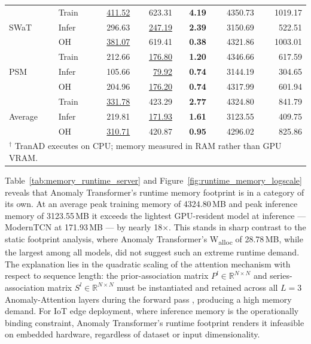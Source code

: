 \documentclass[twoside,11pt,openright]{report}
\begin{document}
\begin{table}[ht]
\begin{tabular}{ll rrrrr}
\midrule
\multirow{3}{*}{SWaT}
    & Train & \underline{411.52} & 623.31 &   \textbf{4.19} & 4350.73 & 1019.17 \\
    & Infer & 296.63 & \underline{247.19} &   \textbf{2.39} & 3150.69 &  522.51 \\
    & OH    & \underline{381.07} & 619.41 &   \textbf{0.38} & 4321.86 & 1003.01 \\
\midrule
\multirow{3}{*}{PSM}
    & Train & 212.66 & \underline{176.80} &   \textbf{1.20} & 4346.66 &  617.59 \\
    & Infer & 105.66 &  \underline{79.92} &   \textbf{0.74} & 3144.19 &  304.65 \\
    & OH    & 204.96 & \underline{176.20} &   \textbf{0.74} & 4317.99 &  601.94 \\
\midrule
\multirow{3}{*}{Average}
    & Train & \underline{331.78} & 423.29 &   \textbf{2.77} & 4324.80 &  841.79 \\
    & Infer & 219.81 & \underline{171.93} &   \textbf{1.61} & 3123.55 &  409.75 \\
    & OH    & \underline{310.71} & 420.87 &   \textbf{0.95} & 4296.02 &  825.86 \\
\bottomrule
\multicolumn{7}{l}{\footnotesize $^\dagger$ TranAD executes on CPU; memory measured in RAM rather than GPU VRAM.}
\end{tabular}
\end{table}

Table~\ref{tab:memory_runtime_server} and Figure~\ref{fig:runtime_memory_logscale} 
reveals that Anomaly Transformer's runtime memory
footprint is in a category of its own. At an average peak training memory of 4324.80\,MB
and peak inference memory of 3123.55\,MB it exceeds the lightest GPU-resident model at inference --- ModernTCN at 171.93\,MB --- by
nearly 18$\times$. This stands in sharp contrast to the static footprint analysis, where
Anomaly Transformer's W\textsubscript{alloc} of  28.78\,MB, while the
largest among all models, did not suggest such an extreme runtime demand. The explanation
lies in the quadratic scaling of the attention mechanism with respect to sequence length:
the prior-association matrix $P^l \in \mathbb{R}^{N \times N}$ and series-association
matrix $S^l \in \mathbb{R}^{N \times N}$ must be instantiated and retained across all
$L = 3$ Anomaly-Attention layers during the forward pass \citep{anomalytransformer2022},
producing a high memory demand. For IoT edge deployment, where inference memory is the 
operationally binding
constraint, Anomaly Transformer's runtime footprint renders it infeasible on embedded hardware, 
regardless of dataset or input dimensionality.
\end{document}
